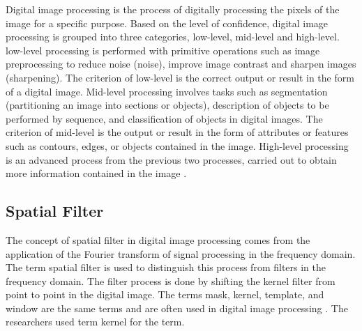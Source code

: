Digital image processing is the process of digitally processing the pixels of the image for a specific purpose. Based on the level of confidence, digital image processing is grouped into three categories, low-level, mid-level and high-level. low-level processing is performed with primitive operations such as image preprocessing to reduce noise (noise), improve image contrast and sharpen images (sharpening). The criterion of low-level is the correct output or result in the form of a digital image. Mid-level processing involves tasks such as segmentation (partitioning an image into sections or objects), description of objects to be performed by sequence, and classification of objects in digital images. The criterion of mid-level is the output or result in the form of attributes or features such as contours, edges, or objects contained in the image. High-level processing is an advanced process from the previous two processes, carried out to obtain more information contained in the image \cite{book:gonzalez}.



\subsection{Spatial Filter}
The concept of spatial filter in digital image processing comes from the application of the Fourier transform of signal processing in the frequency domain. The term spatial filter is used to distinguish this process from filters in the frequency domain. The filter process is done by shifting the kernel filter from point to point in the digital image. The terms mask, kernel, template, and window are the same terms and are often used in digital image processing \cite{book:gonzalez}. The researchers used term kernel for the term.



